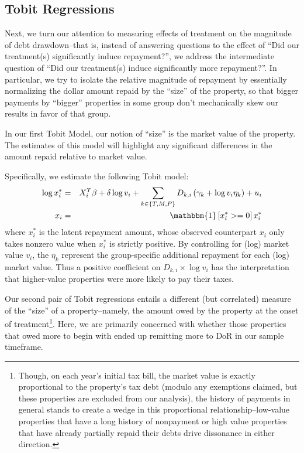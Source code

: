 \documentclass[12pt,titlepage]{article}
\begin{document}
\subsection{Tobit Regressions}

Next, we turn our attention to measuring effects of treatment on the
magnitude of debt drawdown--that is, instead of answering questions to
the effect of ``Did our treatment(s) significantly induce
repayment?'', we address the intermediate question of ``Did
our treatment(s) induce significantly more repayment?''. In particular, we try to isolate the relative magnitude of repayment
by essentially normalizing the dollar amount repaid by the ``size'' of
the property, so that bigger payments by ``bigger'' properties in some
group don't mechanically skew our results in favor of that group.

In our first Tobit Model, our notion of ``size'' is the market value
of the property. The estimates of this model will highlight any
significant differences in the amount repaid relative to market value.

Specifically, we estimate the following Tobit model:
\begin{eqnarray}
\log x_{i}^{*} & = & X^T_i \beta +\delta \log v_{i}+
\sum_{k\in\{T,M,P\}}D_{k,i}\left(\gamma_{k}+\log v_{i}\eta_{k}\right)+u_{i}\\
x_{i} & = & \mathbbm{1}\left[x_{i}^{*}>=0\right]x_{i}^{*} \nonumber
\end{eqnarray}
where  $x_{i}^{*}$ is the latent repayment amount, whose observed
counterpart $x_i$ only takes nonzero value when $x_i^{*}$ is strictly
positive. By controlling for (log) market value $v_i$, the
$\eta_{k}$ represent the group-specific additional repayment for
each (log) market value. Thus a positive coefficient on
$D_{k,i}\times\log v_i$ has the interpretation that higher-value
properties were more likely to pay their taxes.

Our second pair of Tobit regressions entails a different (but
correlated) measure of the ``size'' of a property--namely, the amount
owed by the property at the onset of treatment\footnote{Though, on
  each year's initial tax bill, the market value is exactly
  proportional to the property's tax debt (modulo any exemptions
  claimed, but these properties are excluded from our analysis), the
  history of payments in general stands to create a wedge in this
  proportional relationship--low-value properties that have a long
  history of nonpayment or high value properties that have already
  partially repaid their debts drive dissonance in either direction.}.
Here, we are primarily concerned with whether those properties that
owed more to begin with ended up remitting more to DoR in our sample
timeframe.
\end{document}
